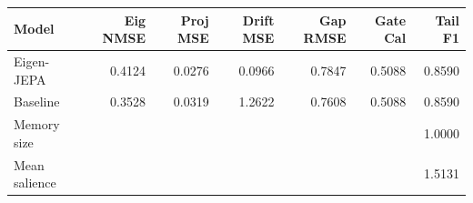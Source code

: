 \begin{tabular}{lrrrrrr}
\toprule
Model & Eig NMSE & Proj MSE & Drift MSE & Gap RMSE & Gate Cal & Tail F1 \\
\midrule
Eigen-JEPA & 0.4124 & 0.0276 & 0.0966 & 0.7847 & 0.5088 & 0.8590 \\
Baseline & 0.3528 & 0.0319 & 1.2622 & 0.7608 & 0.5088 & 0.8590 \\
\midrule
Memory size & \multicolumn{6}{r}{1.0000} \\
Mean salience & \multicolumn{6}{r}{1.5131} \\
\bottomrule
\end{tabular}